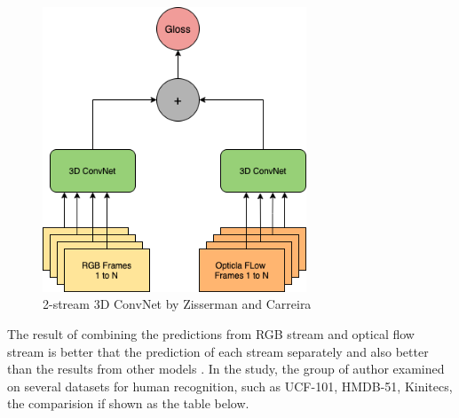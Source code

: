 \documentclass[a4paper, 12pt]{article}
\begin{document}
\begin{figure}[H]
    \centering
    \includegraphics[width=0.7\textwidth]{2-stream I3D Model.png}
    \caption{2-stream 3D ConvNet by Zisserman and Carreira \citep{carreira2017quo}}
    \label{Figure}
\end{figure}

 The result of combining the predictions from RGB stream and optical flow stream is better that the prediction of each stream separately and also better than the results from other models \citep{carreira2017quo}. In the study, the group of author examined on several datasets for human recognition, such as UCF-101, HMDB-51, Kinitecs, the comparision if shown as the table below.

\begin{table}[]
    \centering
    \caption{Comparision betwen models on several human activity datasets \citep{carreira2017quo}}
    \label{table}
\end{table}
\end{document}
